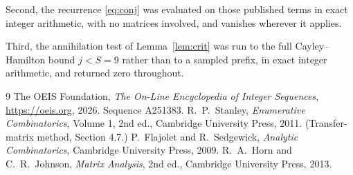\documentclass[11pt,a4paper]{article}
\theoremstyle{plain}
\theoremstyle{definition}
\begin{document}
Second, the recurrence \eqref{eq:conj} was evaluated on those published terms in exact
integer arithmetic, with no matrices involved, and vanishes wherever it applies.

Third, the annihilation test of Lemma~\ref{lem:crit} was run to the full Cayley--Hamilton
bound $j<S=9$ rather than to a sampled prefix, in exact integer arithmetic, and returned
zero throughout.

\begin{thebibliography}{9}
 The OEIS Foundation, \emph{The On-Line Encyclopedia of Integer
Sequences}, \url{https://oeis.org}, 2026. Sequence A251383.
 R.~P.~Stanley, \emph{Enumerative Combinatorics}, Volume 1, 2nd ed.,
Cambridge University Press, 2011. (Transfer-matrix method, Section 4.7.)
 P.~Flajolet and R.~Sedgewick, \emph{Analytic Combinatorics}, Cambridge
University Press, 2009.
 R.~A.~Horn and C.~R.~Johnson, \emph{Matrix Analysis}, 2nd ed., Cambridge
University Press, 2013.
\end{thebibliography}
\end{document}
